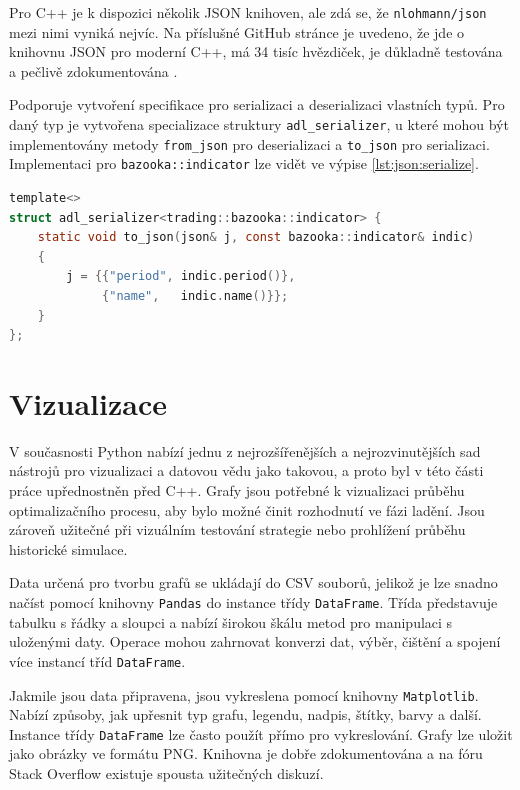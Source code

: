 Pro C++ je k dispozici několik JSON knihoven, ale zdá se, že \texttt{nlohmann/json} mezi nimi vyniká nejvíc.
Na příslušné GitHub stránce je uvedeno, že jde o knihovnu JSON pro moderní C++, má 34 tisíc hvězdiček, je důkladně testována a pečlivě zdokumentována \cite{lohmann}.

Podporuje vytvoření specifikace pro serializaci a deserializaci vlastních typů.
Pro daný typ je vytvořena specializace struktury \texttt{adl\_serializer}, u které mohou být implementovány metody \texttt{from\_json} pro deserializaci a \texttt{to\_json} pro serializaci.
Implementaci pro \texttt{bazooka::indicator} lze vidět ve výpise \ref{lst:json:serialize}.

\begin{lstlisting}[caption={~Implementace deserializace pro vlastní datový typ},label={lst:json:serialize},captionpos=t,abovecaptionskip=-\medskipamount,belowcaptionskip=\medskipamount,language=C]
template<>
struct adl_serializer<trading::bazooka::indicator> {
    static void to_json(json& j, const bazooka::indicator& indic)
    {
        j = {{"period", indic.period()},
             {"name",   indic.name()}};
    }
};
\end{lstlisting}

\chapter{Vizualizace}
V současnosti Python nabízí jednu z nejrozšířenějších a nejrozvinutějších sad nástrojů pro vizualizaci a datovou vědu jako takovou, a proto byl v této části práce upřednostněn před C++.
Grafy jsou potřebné k vizualizaci průběhu optimalizačního procesu, aby bylo možné činit rozhodnutí ve fázi ladění.
Jsou zároveň užitečné při vizuálním testování strategie nebo prohlížení průběhu historické simulace.

Data určená pro tvorbu grafů se ukládají do CSV souborů, jelikož je lze snadno načíst pomocí knihovny \texttt{Pandas} do instance třídy \texttt{DataFrame}.
Třída představuje tabulku s řádky a sloupci a nabízí širokou škálu metod pro manipulaci s uloženými daty.
Operace mohou zahrnovat konverzi dat, výběr, čištění a spojení více instancí tříd \texttt{DataFrame}.

Jakmile jsou data připravena, jsou vykreslena pomocí knihovny \texttt{Matplotlib}.
Nabízí způsoby, jak upřesnit typ grafu, legendu, nadpis, štítky, barvy a další.
Instance třídy \texttt{DataFrame} lze často použít přímo pro vykreslování.
Grafy lze uložit jako obrázky ve formátu PNG.
Knihovna je dobře zdokumentována a na fóru Stack Overflow existuje spousta užitečných diskuzí.

